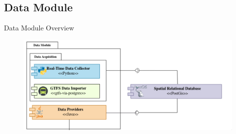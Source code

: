\documentclass[xcolor=dvipsnames,table]{beamer}
\begin{document}
\subsection{Data Module}
\begin{frame}{Data Module Overview}
        \begin{figure}[H]
                \centering
                \includegraphics[width=\textwidth]{images/datamodule.png}
        \end{figure}
\end{frame}
\end{document}
